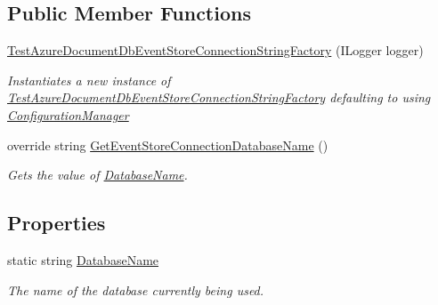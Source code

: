 \subsection*{Public Member Functions}
\begin{DoxyCompactItemize}
\item 
\hyperlink{classCqrs_1_1Ninject_1_1Azure_1_1DocumentDb_1_1Events_1_1TestAzureDocumentDbEventStoreConnectionStringFactory_ab9c02577f0f7b3b43d5d4d53a9755894_ab9c02577f0f7b3b43d5d4d53a9755894}{Test\+Azure\+Document\+Db\+Event\+Store\+Connection\+String\+Factory} (I\+Logger logger)
\begin{DoxyCompactList}\small\item\em Instantiates a new instance of \hyperlink{classCqrs_1_1Ninject_1_1Azure_1_1DocumentDb_1_1Events_1_1TestAzureDocumentDbEventStoreConnectionStringFactory}{Test\+Azure\+Document\+Db\+Event\+Store\+Connection\+String\+Factory} defaulting to using \hyperlink{classCqrs_1_1Azure_1_1DocumentDb_1_1Events_1_1AzureDocumentDbEventStoreConnectionStringFactory_a17abd52e82be8c2dea8f5ef5edb53b85_a17abd52e82be8c2dea8f5ef5edb53b85}{Configuration\+Manager} \end{DoxyCompactList}\item 
override string \hyperlink{classCqrs_1_1Ninject_1_1Azure_1_1DocumentDb_1_1Events_1_1TestAzureDocumentDbEventStoreConnectionStringFactory_a85b4e6cd45d285be6de5db19148118b9_a85b4e6cd45d285be6de5db19148118b9}{Get\+Event\+Store\+Connection\+Database\+Name} ()
\begin{DoxyCompactList}\small\item\em Gets the value of \hyperlink{classCqrs_1_1Ninject_1_1Azure_1_1DocumentDb_1_1Events_1_1TestAzureDocumentDbEventStoreConnectionStringFactory_ad82e2485313ff7802ad125958173f3bf_ad82e2485313ff7802ad125958173f3bf}{Database\+Name}. \end{DoxyCompactList}\end{DoxyCompactItemize}
\subsection*{Properties}
\begin{DoxyCompactItemize}
\item 
static string \hyperlink{classCqrs_1_1Ninject_1_1Azure_1_1DocumentDb_1_1Events_1_1TestAzureDocumentDbEventStoreConnectionStringFactory_ad82e2485313ff7802ad125958173f3bf_ad82e2485313ff7802ad125958173f3bf}{Database\+Name}
\begin{DoxyCompactList}\small\item\em The name of the database currently being used. \end{DoxyCompactList}\end{DoxyCompactItemize}

